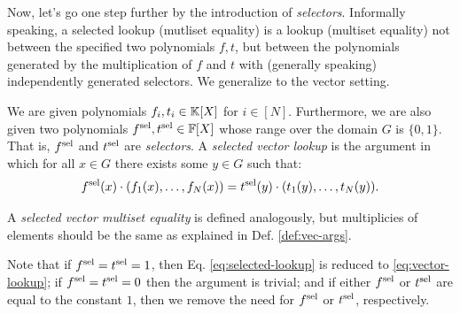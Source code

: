 Now, let's go one step further by the introduction of \textit{selectors}. Informally speaking, a selected lookup (mutliset equality) is a lookup (multiset equality) not between the specified two polynomials $f,t$, but between the polynomials generated by the multiplication of $f$ and $t$ with (generally speaking) independently generated selectors. We generalize to the vector setting.
\begin{definition}\label{def:sel-args}
  We are given polynomials $f_i,t_i \in \mathbb{K}[X]$ for $i\in[N]$. Furthermore, we are also given two polynomials $f^{\text{sel}},t^{\text{sel}} \in \mathbb{F}[X]$ whose range over the domain $G$ is $\{0,1\}$. That is, $f^{\text{sel}}$ and $t^{\text{sel}}$ are \textit{selectors}. A \textit{selected vector lookup} is the argument in which for all $x \in G$ there exists some $y \in G$ such that:
  \begin{equation}\label{eq:selected-lookup}
    f^{\text{sel}}(x) \cdot  (f_1(x),\dots,f_N(x)) = t^{\text{sel}}(y) \cdot (t_1(y),\dots,t_N(y)).
  \end{equation}

  A \textit{selected vector multiset equality} is defined analogously, but multiplicies of elements should be the same as explained in Def. \ref{def:vec-args}.
\end{definition}

\begin{bremark}
Note that if $f^{\text{sel}} = t^{\text{sel}} = 1$, then Eq. \eqref{eq:selected-lookup} is reduced to \eqref{eq:vector-lookup}; if $f^{\text{sel}} = t^{\text{sel}} = 0$ then the argument is trivial; and if either $f^{\text{sel}}$ or $t^{\text{sel}}$ are equal to the constant $1$, then we remove the need for $f^{\text{sel}}$ or $t^{\text{sel}}$, respectively.
\end{bremark}

